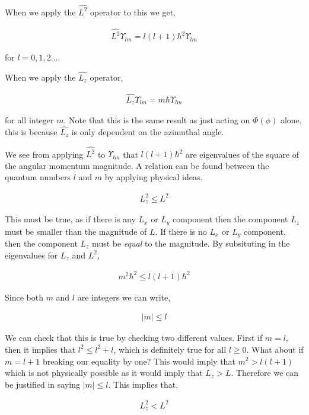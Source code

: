 \documentclass[11pt]{amsart}
\begin{document}
When we apply the $\hat{L^2}$ operator to this we get,

\begin{align*}
  \hat{L^2}\Upsilon_{lm} = l(l+1)\hbar^2\Upsilon_{lm}
\end{align*}

for $l = 0, 1, 2\dots$.

When we apply the $\hat{L_z}$ operator,

\begin{align*}
  \hat{L_z}\Upsilon_{lm} = m\hbar\Upsilon_{lm}
\end{align*}

for all integer $m$. Note that this is the same result as just acting on $\Phi(\phi)$ alone, this is because $\hat{L_z}$ is only dependent on the azimuthal angle.

We see from applying $\hat{L^2}$ to $\Upsilon_{lm}$ that $l(l+1)\hbar^2$ are eigenvalues of the square of the angular momentum magnitude. A relation can be found between the quantum numbers $l$ and $m$ by applying physical ideas.

\begin{align*}
  L_z^2 \leq L^2
\end{align*}

This must be true, as if there is any $L_x$ or $L_y$ component then the component $L_z$ must be smaller than the magnitude of $L$. If there is no $L_x$ or $L_y$ component, then the component $L_z$ must be \textit{equal} to the magnitude. By subsituting in the eigenvalues for $L_z$ and $L^2$,

\begin{align*}
  m^2\hbar^2 \leq l(l+1)\hbar^2
\end{align*}

Since both $m$ and $l$ are integers we can write,

\begin{align*}
  |m| \leq l
\end{align*}

We can check that this is true by checking two different values. First if $m = l$, then it implies that $l^2 \leq l^2 + l$, which is definitely true for all $l \geq 0$. What about if $m = l + 1$ breaking our equality by one? This would imply that $m^2 > l(l + 1)$ which is not physically possible as it would imply that $L_z > L$. Therefore we can be justified in saying $|m| \leq l$. This implies that,

\begin{align*}
  L_z^2 < L^2
\end{align*}
\end{document}
